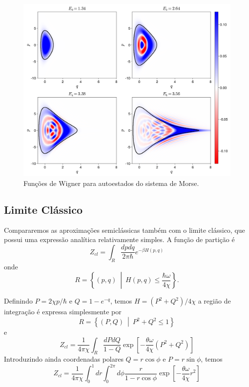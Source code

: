 \documentclass[
	12pt,
	oneside,			%
	a4paper,			%
	english,			%
	brazil				%
	]{abntex2}
\theoremstyle{definition}
\begin{document}
\begin{figure}[H]
    \includegraphics[width=\textwidth]{Imagens/wigner_morse.png}
    \centering
    \caption{Funções de Wigner para autoestados do sistema de Morse.}
    \label{wigner morse}
\end{figure}


\subsection{Limite Clássico}

Compararemos as aproximações semiclássicas também com o limite clássico, que possui uma expressão analítica relativamente simples. A função de partição é
\begin{equation}
    Z_{cl} = \int_R \frac{dp dq}{2\pi \hbar} e^{-\beta H(p,q)} 
\end{equation}
onde
\begin{equation}
    R = \left\{ (p,q) \ \middle| \ H(p,q) \le \frac{\hbar \omega}{4\chi}  \right\}.
\end{equation}

Definindo $P = 2\chi p/\hbar$ e $Q = 1-e^{-q}$, temos $H = \left(P^2+Q^2\right)/4\chi$ a região de integração
é expressa simplesmente por
\begin{equation}
    R = \left\{ (P,Q) \ \middle| \ P^2+Q^2 \le 1  \right\}
\end{equation}
e
\begin{equation}
    Z_{cl} = \frac{1}{4\pi\chi} \int_R \frac{dP dQ}{1-Q}  \exp \left[  -\frac{\theta \omega}{4\chi} (P^2+Q^2) \right]
\end{equation}
Introduzindo ainda coordenadas polares $Q = r \cos \phi$ e $P = r \sin \phi$, temos
\begin{equation}
    Z_{cl} = \frac{1}{4\pi\chi}\int_0^1 d r \int_0^{2\pi} d\phi  \frac{r}{1-r \cos \phi}  \exp \left[  -\frac{\theta \omega}{4\chi} r^2 \right]
\end{equation}
\end{document}
